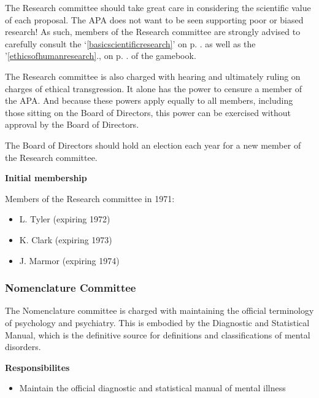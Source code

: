 \begin{refsection}
The Research committee should take great care in considering the scientific value of each proposal. The APA does not want to be seen supporting poor or biased research! As such, members of the Research committee are strongly advised to carefully consult the `\ref{basicscientificresearch}' on p. \pageref{basicscientificresearch}. as well as the '\ref{ethicsofhumanresearch}., on p. \pageref{ethicsofhumanresearch}. of the gamebook.

The Research committee is also charged with hearing and ultimately ruling on charges of ethical transgression. It alone has the power to censure a member of the APA. And because these powers apply equally to all members, including those sitting on the Board of Directors, this power can be exercised without approval by the Board of Directors.

The Board of Directors should hold an election each year for a new member of the Research committee. 

\textbf{Initial membership}

Members of the Research committee in 1971:

\begin{itemize}
\item L. Tyler (expiring 1972)

\item K. Clark (expiring 1973)

\item J. Marmor (expiring 1974)

\end{itemize}

\newpage

\subsubsection{Nomenclature Committee}
\label{nomenclaturecommittee}

The Nomenclature committee is charged with maintaining the official terminology of psychology and psychiatry. This is embodied by the Diagnostic and Statistical Manual, which is the definitive source for definitions and classifications of mental disorders. 

\textbf{Responsibilites}

\begin{itemize}
\item Maintain the official diagnostic and statistical manual of mental illness

\end{itemize}


\end{refsection}
